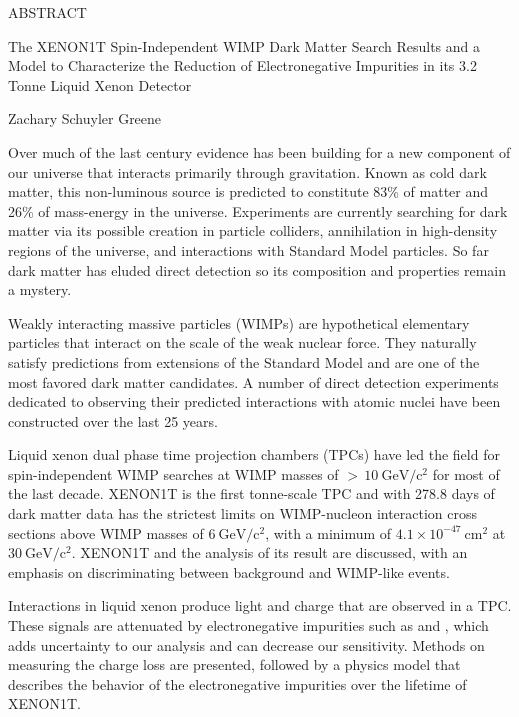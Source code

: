 
\pagestyle{empty} %
\begin{center}
  ABSTRACT

The XENON1T Spin-Independent WIMP Dark Matter Search Results and a Model to Characterize the Reduction of Electronegative Impurities in
its 3.2 Tonne Liquid Xenon Detector

Zachary Schuyler Greene
\end{center}

Over much of the last century evidence has been building for a new component of our universe that interacts primarily through
gravitation.  Known as cold dark matter, this non-luminous source is predicted to constitute 83\% of matter and 26\% of mass-energy in the
universe.  Experiments are currently searching for dark matter via its possible creation in particle colliders, annihilation in
high-density regions of the universe, and interactions with Standard Model particles.  So far dark matter has eluded direct detection so its
composition and properties remain a mystery.

Weakly interacting massive particles (WIMPs) are hypothetical elementary particles that interact on the scale of the weak nuclear
force.  They naturally satisfy predictions from extensions of the Standard Model and are one of the most favored dark matter
candidates.  A number of direct detection experiments dedicated to observing their predicted interactions with atomic nuclei have been
constructed over the last 25 years.

Liquid xenon dual phase time projection chambers (TPCs) have led the field for spin-independent WIMP searches at WIMP masses of
${>}\, 10\ \mathrm{GeV/c^2}$ for most of the last decade.  XENON1T is the first tonne-scale TPC and with 278.8 days of dark matter data
has the strictest limits on WIMP-nucleon interaction cross sections above WIMP masses of $6\ \mathrm{GeV/c^2}$, with a minimum of
$4.1 \times 10^{-47}\ \mathrm{cm^2}$ at $30\ \mathrm{GeV/c^2}$.  XENON1T and the analysis
of its result are discussed, with an emphasis on discriminating between background and WIMP-like events.

Interactions in liquid xenon produce light and charge that are observed in a TPC.  These signals are attenuated by electronegative
impurities such as  and , which adds uncertainty to our analysis and can decrease our sensitivity.  Methods on measuring the
charge loss are presented, followed by a physics model that describes the behavior of the electronegative impurities over the lifetime of
XENON1T.